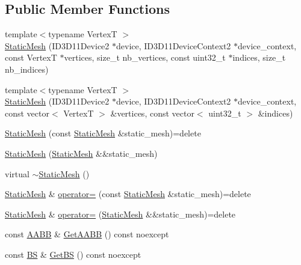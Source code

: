 \subsection*{Public Member Functions}
\begin{DoxyCompactItemize}
\item 
{\footnotesize template$<$typename VertexT $>$ }\\\hyperlink{classmage_1_1_static_mesh_ab66b5c11fee10d2e7cbe8bdd4b45d6fe}{Static\+Mesh} (I\+D3\+D11\+Device2 $\ast$device, I\+D3\+D11\+Device\+Context2 $\ast$device\+\_\+context, const VertexT $\ast$vertices, size\+\_\+t nb\+\_\+vertices, const uint32\+\_\+t $\ast$indices, size\+\_\+t nb\+\_\+indices)
\item 
{\footnotesize template$<$typename VertexT $>$ }\\\hyperlink{classmage_1_1_static_mesh_ad114fc265795fca5dfd181341b7ccb2e}{Static\+Mesh} (I\+D3\+D11\+Device2 $\ast$device, I\+D3\+D11\+Device\+Context2 $\ast$device\+\_\+context, const vector$<$ VertexT $>$ \&vertices, const vector$<$ uint32\+\_\+t $>$ \&indices)
\item 
\hyperlink{classmage_1_1_static_mesh_a15be69ad312c252c9816a57ec1555d73}{Static\+Mesh} (const \hyperlink{classmage_1_1_static_mesh}{Static\+Mesh} \&static\+\_\+mesh)=delete
\item 
\hyperlink{classmage_1_1_static_mesh_a4b3fab6fc753dc32d91bd8260ba3828f}{Static\+Mesh} (\hyperlink{classmage_1_1_static_mesh}{Static\+Mesh} \&\&static\+\_\+mesh)
\item 
virtual \hyperlink{classmage_1_1_static_mesh_a7fbae949f631d29913193a1b2c2ef658}{$\sim$\+Static\+Mesh} ()
\item 
\hyperlink{classmage_1_1_static_mesh}{Static\+Mesh} \& \hyperlink{classmage_1_1_static_mesh_af73dd102f2de9cf7529e380895cfc8ff}{operator=} (const \hyperlink{classmage_1_1_static_mesh}{Static\+Mesh} \&static\+\_\+mesh)=delete
\item 
\hyperlink{classmage_1_1_static_mesh}{Static\+Mesh} \& \hyperlink{classmage_1_1_static_mesh_a38912f8555053abba649bea160d56e46}{operator=} (\hyperlink{classmage_1_1_static_mesh}{Static\+Mesh} \&\&static\+\_\+mesh)=delete
\item 
const \hyperlink{structmage_1_1_a_a_b_b}{A\+A\+BB} \& \hyperlink{classmage_1_1_static_mesh_aaf793aaeccd66c2b1b172f2847db86ed}{Get\+A\+A\+BB} () const noexcept
\item 
const \hyperlink{structmage_1_1_b_s}{BS} \& \hyperlink{classmage_1_1_static_mesh_a007a31e6630f5095af7f1e468f12912f}{Get\+BS} () const noexcept
\end{DoxyCompactItemize}
